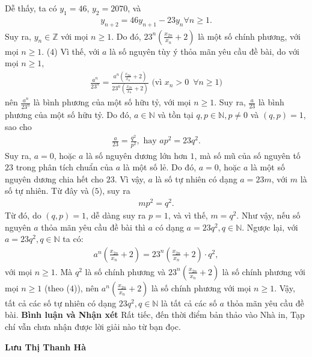 \begin{multicols}{2}
	Dễ thấy, ta có  $y_1 = 46$, $y_2 = 2070$, và
	\begin{align*}
		{y_{n + 2}} = 46{y_{n + 1}} - 23{y_n}\forall n \ge 1.
	\end{align*}
	Suy ra, $y_n \in \mathbb{Z}$ với mọi $n \ge 1$. Do đó, ${23^n}\left( {\frac{{{x_{2n}}}}{{{x_n}}} + 2} \right)$  là một số chính phương, với mọi $n \ge 1$. \hfill  ($4$)
	\vskip 0.05cm
	Vì thế, với $a$ là số nguyên tùy ý thỏa mãn yêu cầu đề bài, do với mọi $n \ge 1$,
	\begin{align*}
		\frac{{{a^n}}}{{{{23}^n}}} = \frac{{{a^n}\left( {\frac{{{x_{2n}}}}{{{x_n}}} + 2} \right)}}{{{{23}^n}\left( {\frac{{{x_{2n}}}}{{{x_n}}} + 2} \right)}} \text{ (vì $x_n >0 \,\,\,\forall n \ge 1$)}	
	\end{align*}
	nên $\frac{{{a^n}}}{{{{23}^n}}}$  là bình phương của một số hữu tỷ, với mọi $n \ge 1$.
	\vskip 0.05cm
	Suy ra, $\frac{a}{23}$  là bình phương của một số hữu tỷ. Do đó, $a \in \mathbb{N}$  và tồn tại  $q,p \in \mathbb{N},p \ne 0$ và $(q, p) = 1$, sao cho
	\begin{align*}
		\frac{a}{{23}} = \frac{{{q^2}}}{{{p^2}}}, \text{ hay } ap^2 = 23q^2. \tag{$5$}
	\end{align*}
	Suy ra, $a = 0$, hoặc $a$ là số nguyên dương lớn hơn $1$, mà số mũ của số nguyên tố $23$ trong phân tích chuẩn của $a$ là một số lẻ. Do đó, $a = 0$, hoặc $a$ là một số nguyên dương chia hết cho $23$. Vì vậy, $a$ là số tự nhiên có dạng $a = 23m$, với $m$ là số tự nhiên. Từ đây và ($5$), suy ra
	\begin{align*}
		m{p^2} = {q^2}.
	\end{align*}
	Từ đó, do $(q, p) = 1$, dễ dàng suy ra $p = 1$, và vì thế, $m = q^2$.
	\vskip 0.05cm  
	Như vậy, nếu số nguyên $a$ thỏa mãn yêu cầu đề bài thì $a$ có dạng $a = 23q^2, q \in \mathbb{N}$.
	\vskip 0.05cm   
	Ngược lại, với $a = 23q^2, q\in \mathbb{N}$    ta có:
	\begin{align*}
		{a^n}\left( {\frac{{{x_{2n}}}}{{{x_n}}} + 2} \right) = {23^n}\left( {\frac{{{x_{2n}}}}{{{x_n}}} + 2} \right) \cdot {q^2},
	\end{align*}
	với mọi $n \ge 1$.
	\vskip 0.05cm
	Mà $q^2$ là số chính phương và  ${23^n}\left( {\frac{{{x_{2n}}}}{{{x_n}}} + 2} \right)$ là số chính phương với mọi $n \ge 1$ (theo ($4$)), nên  ${a^n}\left( {\frac{{{x_{2n}}}}{{{x_n}}} + 2} \right)$ là số chính phương với mọi $n \ge 1$.
	\vskip 0.05cm
	Vậy, tất cả các số tự nhiên có dạng $23q^2, q \in \mathbb{N}$  là tất cả các số $a$ thỏa mãn yêu cầu đề bài.
	\vskip 0.05cm
	\textbf{\color{thachthuctoanhoc}Bình luận và Nhận xét}
	\vskip 0.05cm
	Rất tiếc, đến thời điểm bản thảo vào Nhà in, Tạp chí vẫn chưa nhận được lời giải nào từ bạn đọc.
	\begin{flushright}
		\textbf{\color{thachthuctoanhoc}Lưu Thị Thanh Hà}
	\end{flushright}
\end{multicols}
